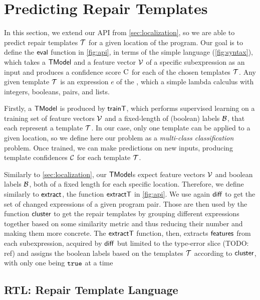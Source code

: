 \section{Predicting Repair Templates}
\label{sec:templ-pred}

In this section, we extend our API from \autoref{sec:localization}, so we are
able to predict repair templates $\mathcal{T}$ for a given location of the program. Our
goal is to define the $\mathsf{eval}$ function in \autoref{fig:api}, in terms of the
simple language \repairLang (\autoref{fig:syntax}), which takes a $\mathsf{TModel}$ and
a feature vector $\mathcal{V}$ of a specific subexpression as an input and produces a
confidence score $\textsc{C}$ for each of the chosen templates $\mathcal{T}$. Any given template
$\mathcal{T}$ is an expression $e$ of the \repairLang, which a simple lambda calculus
with integers, booleans, pairs, and lists.

Firstly, a $\mathsf{TModel}$ is produced by $\mathsf{trainT}$, which performs supervised
learning on a training set of feature vectors $\mathcal{V}$ and a fixed-length of
(boolean) labels $\mathcal{B}$, that each represent a template $\mathcal{T}$. In our case, only
one template can be applied to a given location, so we define here our problem
as a \emph{multi-class classification} problem. Once trained, we can make
predictions on new inputs, producing template confidences $\mathcal{C}$ for each
template $\mathcal{T}$.

Similarly to \autoref{sec:localization}, our $\mathsf{TModel}$s expect feature vectors
$\mathcal{V}$ and boolean labels $\mathcal{B}$, both of a fixed length for each specific location.
Therefore, we define similarly to $\mathsf{extract}$, the function $\mathsf{extractT}$ in
\autoref{fig:api}. We use again $\mathsf{diff}$ to get the set of changed expressions
of a given program pair. Those are then used by the function $\mathsf{cluster}$ to
get the repair templates by grouping different expressions together based on
some similarity metric and thus reducing their number and making them more
concrete. The $\mathsf{extractT}$ function, then, extracts $\mathsf{features}$ from each
subexpression, acquired by $\mathsf{diff}$ but limited to the type-error slice (TODO:
ref) and assigns the boolean labels based on the templates $\mathcal{T}$ according to
$\mathsf{cluster}$, with only one being $\mathtt{true}$ at a time


\subsection{RTL: Repair Template Language}
\label{subsec:lang}




